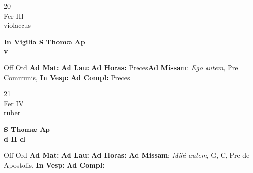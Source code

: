 \documentclass[10pt, openany]{book}
\begin{document}
        \begin{center}
            \begin{minipage}{3.5in}
                \vspace{2em}
                \begin{minipage}{0.5in}
                    {\Huge 20} \\
                    {\normalsize Fer III} \\
                    {\normalsize violaceus}
                \end{minipage}
                \begin{minipage}{3.0in}
                    \textbf{ \large In Vigilia S Thomæ Ap \\
                    \textnormal{\normalsize v}} \\ 
                \end{minipage}
                \begin{justify}Off Ord
                    \textbf{Ad Mat: }
                    \textbf{Ad Lau: }
                    \textbf{Ad Horas: }Preces\textbf{Ad Missam}: \textit{Ego autem,} Pre Communis,  
                    \textbf{In Vesp: }
                    \textbf{Ad Compl: }Preces
                \end{justify}
            \end{minipage}
        \end{center}
    
        \begin{center}
            \begin{minipage}{3.5in}
                \vspace{2em}
                \begin{minipage}{0.5in}
                    {\Huge 21} \\
                    {\normalsize Fer IV} \\
                    {\normalsize ruber}
                \end{minipage}
                \begin{minipage}{3.0in}
                    \textbf{ \large S Thomæ Ap \\
                    \textnormal{\normalsize d II cl}} \\ 
                \end{minipage}
                \begin{justify}Off Ord
                    \textbf{Ad Mat: }
                    \textbf{Ad Lau: }
                    \textbf{Ad Horas: }\textbf{Ad Missam}: \textit{Mihi autem,} G, C, Pre de Apostolis,  
                    \textbf{In Vesp: }
                    \textbf{Ad Compl: }
                \end{justify}
            \end{minipage}
        \end{center}
    
\end{document}
